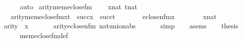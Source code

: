 \begin{isabellebody}
\ \ \ \ \isamarkupfalse%
\ auto\isanewline
{}\isamarkupfalse%
%
\endisatagproof
{\isafoldproof}%
%
\isadelimproof
\isanewline
%
\endisadelimproof
\isanewline
{}\isamarkupfalse%
\ arity{\isacharunderscore}{\kern0pt}mem{\isacharunderscore}{\kern0pt}eclose{\isacharunderscore}{\kern0pt}fm\ {\isacharcolon}{\kern0pt}\isanewline
\ \ \ {\isachardoublequoteopen}x{\isasymin}nat{\isachardoublequoteclose}\ {\isachardoublequoteopen}t{\isasymin}nat{\isachardoublequoteclose}\isanewline
\ \ \ {\isachardoublequoteopen}arity{\isacharparenleft}{\kern0pt}mem{\isacharunderscore}{\kern0pt}eclose{\isacharunderscore}{\kern0pt}fm{\isacharparenleft}{\kern0pt}x{\isacharcomma}{\kern0pt}t{\isacharparenright}{\kern0pt}{\isacharparenright}{\kern0pt}\ {\isacharequal}{\kern0pt}\ succ{\isacharparenleft}{\kern0pt}x{\isacharparenright}{\kern0pt}\ {\isasymunion}\ succ{\isacharparenleft}{\kern0pt}t{\isacharparenright}{\kern0pt}{\isachardoublequoteclose}\isanewline
%
\isadelimproof
%
\endisadelimproof
%
\isatagproof
{}\isamarkupfalse%
\ {\isacharminus}{\kern0pt}\ \ \isanewline
\ \ \isamarkupfalse%
\ {\isacharquery}{\kern0pt}{\isasymphi}{\isacharequal}{\kern0pt}{\isachardoublequoteopen}eclose{\isacharunderscore}{\kern0pt}n{\isacharunderscore}{\kern0pt}fm{\isacharparenleft}{\kern0pt}x\ {\isacharhash}{\kern0pt}{\isacharplus}{\kern0pt}\ {}{\isacharcomma}{\kern0pt}\ {}{\isacharcomma}{\kern0pt}\ {}{\isacharparenright}{\kern0pt}{\isachardoublequoteclose}\isanewline
\ \ \isamarkupfalse%
\ {\isacartoucheopen}x{\isasymin}nat{\isacartoucheclose}\isanewline
\ \ \isamarkupfalse%
\ {\isachardoublequoteopen}arity{\isacharparenleft}{\kern0pt}{\isacharquery}{\kern0pt}{\isasymphi}{\isacharparenright}{\kern0pt}\ {\isacharequal}{\kern0pt}\ x{\isacharhash}{\kern0pt}{\isacharplus}{\kern0pt}{}{\isachardoublequoteclose}\ \isanewline
\ \ \ \ \isamarkupfalse%
\ arity{\isacharunderscore}{\kern0pt}eclose{\isacharunderscore}{\kern0pt}n{\isacharunderscore}{\kern0pt}fm\ nat{\isacharunderscore}{\kern0pt}union{\isacharunderscore}{\kern0pt}abs{}\ \isanewline
\ \ \ \ \isamarkupfalse%
\ simp\isanewline
\ \ \isamarkupfalse%
\ assms\isanewline
\ \ \isamarkupfalse%
\ {\isacharquery}{\kern0pt}thesis\isanewline
\ \ \ \ \isamarkupfalse%
\ mem{\isacharunderscore}{\kern0pt}eclose{\isacharunderscore}{\kern0pt}fm{\isacharunderscore}{\kern0pt}def\ \isanewline

\end{isabellebody}

